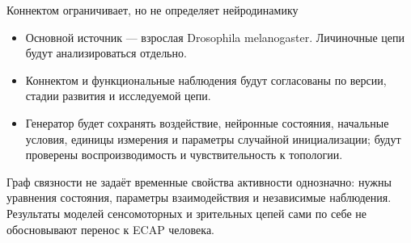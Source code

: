 \begin{frame}{Коннектом ограничивает, но не определяет нейродинамику}
\begin{itemize}
\item Основной источник --- взрослая Drosophila melanogaster. Личиночные цепи будут анализироваться отдельно.
\item Коннектом и функциональные наблюдения будут согласованы по версии, стадии развития и исследуемой цепи.
\item Генератор будет сохранять воздействие, нейронные состояния, начальные условия, единицы измерения и параметры случайной инициализации; будут проверены воспроизводимость и чувствительность к топологии.
\end{itemize}
\SlideGap
Граф связности не задаёт временные свойства активности однозначно: нужны уравнения состояния, параметры взаимодействия и независимые наблюдения. Результаты моделей сенсомоторных и зрительных цепей сами по себе не обосновывают перенос к ECAP человека.
\end{frame}
